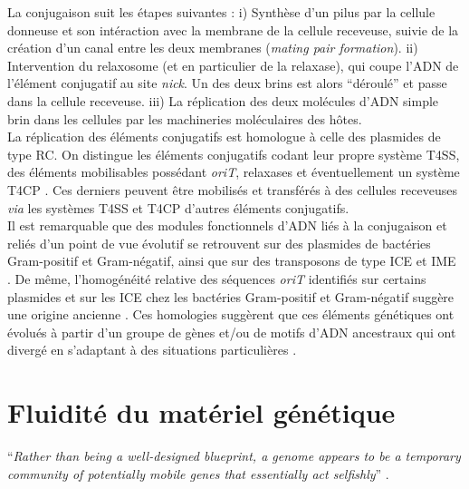 	La conjugaison suit les étapes suivantes \citep{lawley2004bacterial}: i) Synthèse d'un pilus par la cellule donneuse et son intéraction avec la membrane de la cellule receveuse, suivie de la création d'un canal entre les deux membranes (\textit{mating pair formation}). ii) Intervention du relaxosome (et en particulier de la relaxase), qui coupe l'ADN de l'élément conjugatif au site \textit{nick}. Un des deux brins est alors “déroulé” et passe dans la cellule receveuse. iii) La réplication des deux molécules d'ADN simple brin dans les cellules par les machineries moléculaires des hôtes.\\
	La réplication des éléments conjugatifs est homologue à celle des plasmides de type RC. On distingue les éléments conjugatifs codant leur propre système T4SS, des éléments mobilisables possédant \textit{oriT}, relaxases et éventuellement un système T4CP \citep{Smillie2010}. Ces derniers peuvent être mobilisés et transférés à des cellules receveuses \textit{via} les systèmes T4SS et T4CP d'autres éléments conjugatifs.\\ 
	Il est remarquable que des modules fonctionnels d'ADN liés à la conjugaison et reliés d'un point de vue évolutif se retrouvent sur des plasmides de bactéries Gram-positif et Gram-négatif, ainsi que sur des transposons de type ICE et IME \citep{Francia2004}. De même, l'homogénéité relative des séquences \textit{oriT} identifiés sur certains plasmides et sur les ICE chez les bactéries Gram-positif et Gram-négatif suggère une origine ancienne \citep{Francia2004}. Ces homologies suggèrent que ces éléments génétiques ont évolués à partir d'un groupe de gènes et/ou de motifs d'ADN ancestraux qui ont divergé en s'adaptant à des situations particulières \citep{Francia2004}. 
 
 
 \section{Fluidité du matériel génétique}\label{parevoldesrepl}

“\textit{Rather than being a well-designed blueprint, a genome appears to be a temporary community of potentially mobile genes that essentially act selfishly}” \citep{mochizuki2006genetic}.\\\\


